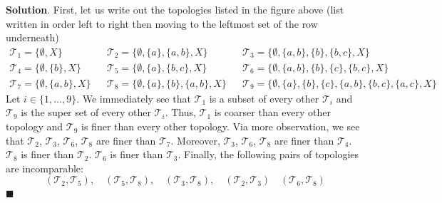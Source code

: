\documentclass[12pt]{article}
\renewcommand{\=}[1]{\stackrel{#1}{=}} %
\providecommand{\T}{\mathcal{T}}
\theoremstyle{definition}
\newenvironment{s}{%
        \begin{trivlist} \item \textbf{Solution}. }{%
            \hspace*{\fill} $\blacksquare$\end{trivlist}}%
\begin{document}
\begin{s}
    First, let us write out the topologies listed in the figure above (list written in order left to right then moving to the leftmost set of the row underneath)
    \begin{align*}
        \T_1 = \{\emptyset, X\} && \T_2 = \{\emptyset, \{a\}, \{a,b\}, X\} && \T_3 = \{\emptyset,\{a,b\},\{b\},\{b,c\},X\} \\
        \T_4 = \{\emptyset, \{b\}, X\} && \T_5 = \{\emptyset, \{a\}, \{b,c\}, X\} && \T_6 = \{\emptyset,\{a,b\},\{b\},\{c\},\{b,c\},X\} \\
        \T_7 = \{\emptyset, \{a,b\}, X\} && \T_8 = \{\emptyset, \{a\},\{b\},\{a,b\},X\} &&
        \T_9 = \{\emptyset, \{a\},\{b\},\{c\}, \{a,b\}, \{b,c\}, \{a,c\}, X\}
    \end{align*}
    Let $i\in\{1,\hdots,9\}$. We immediately see that $\T_1$ is a subset of every other $\T_i$ and $\T_9$ is the super set of every
    other $\T_i$. Thus, $\T_1$ is coarser than every other topology and $\T_9$ is finer than every other topology. Via more 
    observation, we see that $\T_2$, $\T_3$, $\T_6$, $\T_8$ are finer than $\T_7$. Moreover, $\T_3$, $\T_6$, $\T_8$ are finer than $\T_4$.
    $\T_8$ is finer than $\T_2$. $\T_6$ is finer than $\T_3$. Finally, the following pairs of topologies are incomparable:
    \[ (\T_2, \T_5),\quad (\T_5,\T_8),\quad (\T_3,\T_8),\quad (\T_2,\T_3) \quad (\T_6, \T_8)\]
\end{s}
\end{document}
